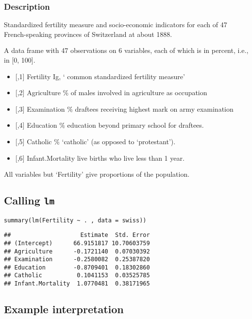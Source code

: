 \documentclass[12pt,openright,oneside,a4paper,chapter=TITLE,section=TITLE,subsection=Title,english,french,spanish,portugues,sumario=tradicional]{04-class-files/abntex2}
\providecommand{\tightlist}{%
  \setlength{\itemsep}{0pt}\setlength{\parskip}{0pt}}
\begin{document}
\hypertarget{description}{%
\subsubsection{Description}\label{description}}

Standardized fertility measure and socio-economic indicators for each of 47 French-speaking provinces of Switzerland at about 1888.

A data frame with 47 observations on 6 variables, each of which is in percent, i.e., in {[}0, 100{]}.

\begin{itemize}
\tightlist
\item
  {[},1{]} Fertility Ig, ` common standardized fertility measure'
\item
  {[},2{]} Agriculture \% of males involved in agriculture as occupation
\item
  {[},3{]} Examination \% draftees receiving highest mark on army examination
\item
  {[},4{]} Education \% education beyond primary school for draftees.
\item
  {[},5{]} Catholic \% `catholic' (as opposed to `protestant').
\item
  {[},6{]} Infant.Mortality live births who live less than 1 year.
\end{itemize}

All variables but `Fertility' give proportions of the population.

\hypertarget{calling-lm}{%
\subsection{\texorpdfstring{Calling \texttt{lm}}{Calling lm}}\label{calling-lm}}

\texttt{summary(lm(Fertility\ \textasciitilde{}\ .\ ,\ data\ =\ swiss))}

\begin{verbatim}
##                    Estimate  Std. Error
## (Intercept)      66.9151817 10.70603759
## Agriculture      -0.1721140  0.07030392
## Examination      -0.2580082  0.25387820
## Education        -0.8709401  0.18302860
## Catholic          0.1041153  0.03525785
## Infant.Mortality  1.0770481  0.38171965
\end{verbatim}

\hypertarget{example-interpretation}{%
\subsection{Example interpretation}\label{example-interpretation}}
\end{document}
